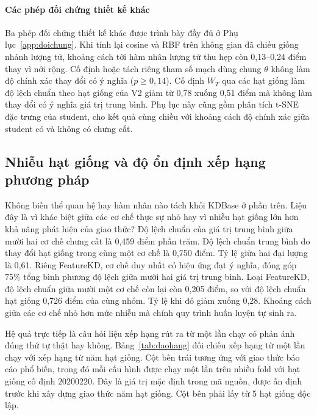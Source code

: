 \paragraph{Các phép đối chứng thiết kế khác}

Ba phép đối chứng thiết kế khác được trình bày đầy đủ ở
Phụ lục~\ref{app:doichung}. Khi tính lại cosine và RBF trên không gian đã
chiếu giống nhánh lượng tử, khoảng cách tới hàm nhân lượng tử thu hẹp còn
0,13--0,24 điểm thay vì nới rộng. Cố định hoặc tách riêng tham số mạch dùng
chung $\theta$ không làm độ chính xác thay đổi có ý nghĩa
($p \geq 0{,}14$). Cố định $W_T$ qua các hạt giống làm độ lệch chuẩn theo
hạt giống của V2 giảm từ 0,78 xuống 0,51 điểm mà không làm thay đổi có ý
nghĩa giá trị trung bình. Phụ lục này cũng gồm phân tích t-SNE đặc trưng của
student, cho kết quả cùng chiều với khoảng cách độ chính xác giữa student có
và không có chưng cất.

\subsection{Nhiễu hạt giống và độ ổn định xếp hạng phương pháp}
\label{sec:xephang}

Không biến thể quan hệ hay hàm nhân nào tách khỏi KDBase ở phần trên.
Liệu đây là vì khác biệt giữa các cơ chế thực sự nhỏ hay vì nhiễu hạt giống
lớn hơn khả năng phát hiện của giao thức? Độ lệch chuẩn của giá trị trung
bình giữa mười hai cơ chế chưng cất là 0,459 điểm phần trăm. Độ lệch chuẩn
trung bình do thay đổi hạt giống trong cùng một cơ chế là 0,750 điểm. Tỷ
lệ giữa hai đại lượng là 0,61. Riêng FeatureKD, cơ chế duy nhất có hiệu ứng
đạt ý nghĩa, đóng góp 75\% tổng bình phương độ lệch giữa mười hai giá trị
trung bình. Loại FeatureKD, độ lệch chuẩn giữa mười một cơ chế còn lại còn 0,205 điểm,
so với độ lệch chuẩn hạt giống 0,726 điểm của cùng nhóm. Tỷ lệ khi đó giảm
xuống 0,28. Khoảng cách giữa các cơ chế nhỏ hơn mức nhiễu
mà chính quy trình huấn luyện tự sinh ra.

Hệ quả trực tiếp là câu hỏi liệu xếp hạng rút ra từ một lần chạy có phản
ánh đúng thứ tự thật hay không. Bảng~\ref{tab:daohang} đối chiếu xếp hạng
từ một lần chạy với xếp hạng từ năm hạt giống. Cột bên trái tương ứng với
giao thức báo cáo phổ biến, trong đó mỗi cấu hình được chạy một lần trên
nhiều fold với hạt giống cố định $20200220$. Đây là giá trị mặc định trong
mã nguồn, được ấn định trước khi xây dựng giao thức năm hạt giống. Cột bên
phải lấy từ 5 hạt giống độc lập.

